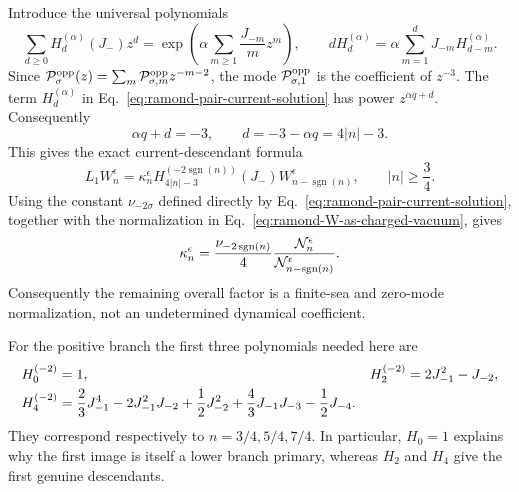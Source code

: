 \documentclass[11pt]{article}
\begin{document}
Introduce the universal polynomials
\begin{equation}
 \sum_{d\geq0}H_d^{(\alpha)}(J_-)z^d
 =\exp\left(\alpha\sum_{m\geq1}\frac{J_{-m}}{m}z^m\right),
 \qquad
 dH_d^{(\alpha)}
 =\alpha\sum_{m=1}^dJ_{-m}H_{d-m}^{(\alpha)}.
 \label{eq:ramond-Heisenberg-descendants}
\end{equation}
Since
\({\cal P}^{\mathrm{opp}}_\sigma(z)=\sum_m
{\cal P}^{\mathrm{opp}}_{\sigma,m}z^{-m-2}\), the mode
\({\cal P}^{\mathrm{opp}}_{\sigma,1}\) is the coefficient of \(z^{-3}\).
The term \(H_d^{(\alpha)}\) in
Eq.~\eqref{eq:ramond-pair-current-solution} has power
\(z^{\alpha q+d}\).  Consequently
\begin{equation}
 \alpha q+d=-3,
 \qquad
 d=-3-\alpha q=4|n|-3.
 \label{eq:ramond-pair-mode-selection}
\end{equation}
This gives the exact current-descendant formula
\begin{equation}
 \boxed{
 L_1W_n^\epsilon
 =\kappa_n^\epsilon
 H_{4|n|-3}^{(-2\operatorname{sgn}(n))}(J_-)
 W_{n-\operatorname{sgn}(n)}^\epsilon,
 \qquad |n|\geq\frac34.}
 \label{eq:ramond-L1-Heisenberg-construction}
\end{equation}
Using the constant \(\nu_{-2\sigma}\) defined directly by
Eq.~\eqref{eq:ramond-pair-current-solution}, together with the normalization
in Eq.~\eqref{eq:ramond-W-as-charged-vacuum}, gives
\begin{equation}
 \kappa_n^\epsilon
 =\frac{\nu_{-2\operatorname{sgn}(n)}}4
  \frac{{\cal N}_n^\epsilon}
       {{\cal N}_{n-\operatorname{sgn}(n)}^\epsilon}.
 \label{eq:ramond-kappa-normalization}
\end{equation}
Consequently the remaining overall factor is a finite-sea and zero-mode
normalization, not an undetermined dynamical coefficient.

For the positive branch the first three polynomials needed here are
\begin{align}
 H_0^{(-2)}={}&1,
 &
 H_2^{(-2)}={}&2J_{-1}^2-J_{-2},
 \notag\\
 H_4^{(-2)}={}&\frac23J_{-1}^4-2J_{-1}^2J_{-2}
 +\frac12J_{-2}^2+\frac43J_{-1}J_{-3}-\frac12J_{-4}.
 \label{eq:ramond-first-Heisenberg-polynomials}
\end{align}
They correspond respectively to \(n=3/4,5/4,7/4\).  In particular,
\(H_0=1\) explains why the first image is itself a lower branch primary,
whereas \(H_2\) and \(H_4\) give the first genuine descendants.
\end{document}
